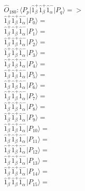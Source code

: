\documentclass[14pt]{article}
\begin{document}
    $\hat{O}_{180}:  \langle{P_p}\vert \hat{1}_{\beta}^{+}\hat{1}_{\beta}^{+}\hat{1}_{\alpha}^{-} \vert{P_q}\rangle => $ \\ 
    $ \hat{1}_{\beta}^{+}\hat{1}_{\beta}^{+}\hat{1}_{\alpha}^{-} \vert{P_{0}}\rangle =  $ \\ 
    $ \hat{1}_{\beta}^{+}\hat{1}_{\beta}^{+}\hat{1}_{\alpha}^{-} \vert{P_{1}}\rangle =  $ \\ 
    $ \hat{1}_{\beta}^{+}\hat{1}_{\beta}^{+}\hat{1}_{\alpha}^{-} \vert{P_{2}}\rangle =  $ \\ 
    $ \hat{1}_{\beta}^{+}\hat{1}_{\beta}^{+}\hat{1}_{\alpha}^{-} \vert{P_{3}}\rangle =  $ \\ 
    $ \hat{1}_{\beta}^{+}\hat{1}_{\beta}^{+}\hat{1}_{\alpha}^{-} \vert{P_{4}}\rangle =  $ \\ 
    $ \hat{1}_{\beta}^{+}\hat{1}_{\beta}^{+}\hat{1}_{\alpha}^{-} \vert{P_{5}}\rangle =  $ \\ 
    $ \hat{1}_{\beta}^{+}\hat{1}_{\beta}^{+}\hat{1}_{\alpha}^{-} \vert{P_{6}}\rangle =  $ \\ 
    $ \hat{1}_{\beta}^{+}\hat{1}_{\beta}^{+}\hat{1}_{\alpha}^{-} \vert{P_{7}}\rangle =  $ \\ 
    $ \hat{1}_{\beta}^{+}\hat{1}_{\beta}^{+}\hat{1}_{\alpha}^{-} \vert{P_{8}}\rangle =  $ \\ 
    $ \hat{1}_{\beta}^{+}\hat{1}_{\beta}^{+}\hat{1}_{\alpha}^{-} \vert{P_{9}}\rangle =  $ \\ 
    $ \hat{1}_{\beta}^{+}\hat{1}_{\beta}^{+}\hat{1}_{\alpha}^{-} \vert{P_{10}}\rangle =  $ \\ 
    $ \hat{1}_{\beta}^{+}\hat{1}_{\beta}^{+}\hat{1}_{\alpha}^{-} \vert{P_{11}}\rangle =  $ \\ 
    $ \hat{1}_{\beta}^{+}\hat{1}_{\beta}^{+}\hat{1}_{\alpha}^{-} \vert{P_{12}}\rangle =  $ \\ 
    $ \hat{1}_{\beta}^{+}\hat{1}_{\beta}^{+}\hat{1}_{\alpha}^{-} \vert{P_{13}}\rangle =  $ \\ 
    $ \hat{1}_{\beta}^{+}\hat{1}_{\beta}^{+}\hat{1}_{\alpha}^{-} \vert{P_{14}}\rangle =  $ \\ 
    $ \hat{1}_{\beta}^{+}\hat{1}_{\beta}^{+}\hat{1}_{\alpha}^{-} \vert{P_{15}}\rangle =  $ \\ 
    
\end{document}
